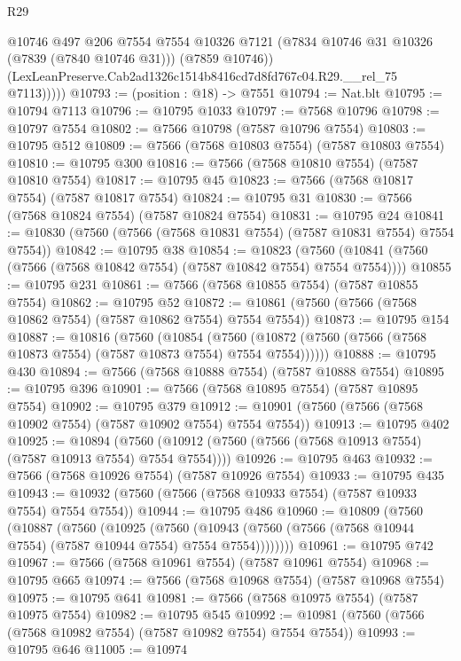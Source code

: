 \begin{lexlean}{R29}
\begin{coremodule}
              @10746
              @497
              @206
              @7554
              @7554
              @10326
              @7121
              (@7834 @10746 @31 @10326 (@7839 (@7840 @10746 @31)))
              (@7859 @10746))
            (LexLeanPreserve.Cab2ad1326c1514b8416cd7d8fd767c04.R29.__rel_75 @7113)))))
@10793 := (position : @18) -> @7551
@10794 := Nat.blt
@10795 := @10794 @7113
@10796 := @10795 @1033
@10797 := @7568 @10796
@10798 := @10797 @7554
@10802 := @7566 @10798 (@7587 @10796 @7554)
@10803 := @10795 @512
@10809 := @7566 (@7568 @10803 @7554) (@7587 @10803 @7554)
@10810 := @10795 @300
@10816 := @7566 (@7568 @10810 @7554) (@7587 @10810 @7554)
@10817 := @10795 @45
@10823 := @7566 (@7568 @10817 @7554) (@7587 @10817 @7554)
@10824 := @10795 @31
@10830 := @7566 (@7568 @10824 @7554) (@7587 @10824 @7554)
@10831 := @10795 @24
@10841 := @10830 (@7560 (@7566 (@7568 @10831 @7554) (@7587 @10831 @7554) @7554 @7554))
@10842 := @10795 @38
@10854 := @10823
    (@7560 (@10841 (@7560 (@7566 (@7568 @10842 @7554) (@7587 @10842 @7554) @7554 @7554))))
@10855 := @10795 @231
@10861 := @7566 (@7568 @10855 @7554) (@7587 @10855 @7554)
@10862 := @10795 @52
@10872 := @10861 (@7560 (@7566 (@7568 @10862 @7554) (@7587 @10862 @7554) @7554 @7554))
@10873 := @10795 @154
@10887 := @10816
    (@7560
      (@10854
        (@7560 (@10872 (@7560 (@7566 (@7568 @10873 @7554) (@7587 @10873 @7554) @7554 @7554))))))
@10888 := @10795 @430
@10894 := @7566 (@7568 @10888 @7554) (@7587 @10888 @7554)
@10895 := @10795 @396
@10901 := @7566 (@7568 @10895 @7554) (@7587 @10895 @7554)
@10902 := @10795 @379
@10912 := @10901 (@7560 (@7566 (@7568 @10902 @7554) (@7587 @10902 @7554) @7554 @7554))
@10913 := @10795 @402
@10925 := @10894
    (@7560 (@10912 (@7560 (@7566 (@7568 @10913 @7554) (@7587 @10913 @7554) @7554 @7554))))
@10926 := @10795 @463
@10932 := @7566 (@7568 @10926 @7554) (@7587 @10926 @7554)
@10933 := @10795 @435
@10943 := @10932 (@7560 (@7566 (@7568 @10933 @7554) (@7587 @10933 @7554) @7554 @7554))
@10944 := @10795 @486
@10960 := @10809
    (@7560
      (@10887
        (@7560
          (@10925
            (@7560
              (@10943 (@7560 (@7566 (@7568 @10944 @7554) (@7587 @10944 @7554) @7554 @7554))))))))
@10961 := @10795 @742
@10967 := @7566 (@7568 @10961 @7554) (@7587 @10961 @7554)
@10968 := @10795 @665
@10974 := @7566 (@7568 @10968 @7554) (@7587 @10968 @7554)
@10975 := @10795 @641
@10981 := @7566 (@7568 @10975 @7554) (@7587 @10975 @7554)
@10982 := @10795 @545
@10992 := @10981 (@7560 (@7566 (@7568 @10982 @7554) (@7587 @10982 @7554) @7554 @7554))
@10993 := @10795 @646
@11005 := @10974

\end{coremodule}
\end{lexlean}
